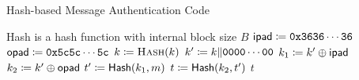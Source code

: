 \begin{algorithm}[t]
\caption{Hash-based Message Authentication Code}
\label{alg:hmac}
\begin{algorithmic}[1]
\Require \textsf{Hash} is a hash function with internal block size $B$
    \State $\textsf{ipad} \coloneqq{} \texttt{0x3636}\cdots\texttt{36}$
    \State $\textsf{opad} \coloneqq{} \texttt{0x5c5c}\cdots\texttt{5c}$
        \State $k \coloneqq{} \textsc{Hash}(k)$
    \EndIf
    \State $k' \coloneqq{} k\|\texttt{0000}\cdots\texttt{00}$
    \State $k_{1} \coloneqq{} k' \oplus \textsf{ipad}$
    \State $k_{2} \coloneqq{} k' \oplus \textsf{opad}$
    \State $t' \coloneqq{} \textsf{Hash}(k_{1}, m)$
    \State $t \coloneqq{} \textsf{Hash}(k_{2}, t')$
    \State \Return $t$
\EndProcedure
\end{algorithmic}
\end{algorithm}
